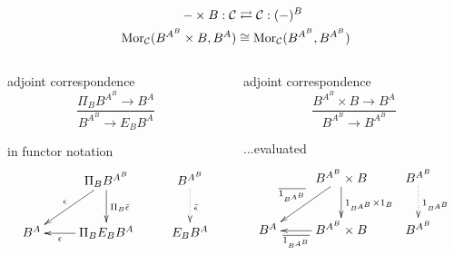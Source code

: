 \begin{frame}[t]
\begin{block}{}
\abovedisplayskip=0pt
\begin{align*}
- \times B: \mathcal{C} & \rightleftarrows \mathcal{C}: (-)^B\\
\mathop{\rm Mor}\nolimits_{\mathcal{C}}(B^{A^B} \times B, B^A) & \cong  \mathop{\rm Mor}\nolimits_{\mathcal{C}}(B^{A^B}, B^{A^B})
\end{align*}
\end{block}
\begin{columns}[t]
    \begin{column}{0.5\textwidth}
    		\begin{block}{adjoint correspondence}
		\abovedisplayskip=0pt
		$$
			\frac{ \Pi_B B^{A^B} \longrightarrow B^A}{B^{A^B} \longrightarrow E_B B^A}
		$$
		\end{block}	
\begin{block}{in functor notation}
		\abovedisplayskip=0pt
			$$
			\xymatrix{
			& \Pi_B B^{A^B} \ar[d]^{\Pi_B \bar{\epsilon}} \ar[dl]_{\epsilon} & B^{A^B} \ar@{.>}[d]^{\bar{\epsilon}}\\
			B^A & \Pi_B E_B B^A \ar[l]^-{\epsilon} & E_B B^A}
			$$
		\end{block}
    \end{column}
    \begin{column}{0.5\textwidth}
		\begin{block}{adjoint correspondence}
		\abovedisplayskip=0pt
		$$
			\frac{B^{A^B} \times B \longrightarrow B^A}{B^{A^B} \longrightarrow B^{A^B}}
		$$
		\end{block}
		\begin{block}{...evaluated}
		\abovedisplayskip=0pt
			$$
			\xymatrix{
			& B^{A^B} \times B \ar[d]^{1_{B^{A^B}} \times 1_B} \ar[dl]_{\overline{1_{B^{A^B}}}} & B^{A^B} \ar@{.>}[d]^{1_{B^{A^B}}}\\
			B^A & B^{A^B} \times B \ar[l]^-{\overline{1_{B^{A^B}}}} & B^{A^B}}
			$$
		\end{block}	
    \end{column}
\end{columns}
\end{frame}


